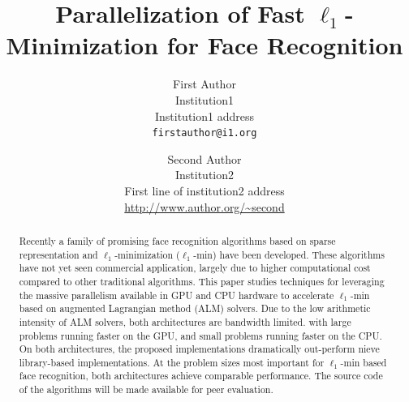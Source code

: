 \documentclass[10pt,twocolumn,letterpaper]{article}
\begin{document}
\title{Parallelization of Fast $\ell_1$-Minimization for Face Recognition}

\author{First Author\\
Institution1\\
Institution1 address\\
{\tt\small firstauthor@i1.org}
\and
Second Author\\
Institution2\\
First line of institution2 address\\
{\small\url{http://www.author.org/~second}}
}

\maketitle

\begin{abstract} Recently a family of promising face recognition algorithms
based on sparse representation and $\ell_1$-minimization ($\ell_1$-min) have been
developed.  These algorithms have not yet seen commercial application, 
largely due to higher computational cost compared to other traditional
algorithms. This paper studies techniques for leveraging the 
massive parallelism available in GPU and CPU hardware to accelerate
$\ell_1$-min based on augmented Lagrangian method (ALM) solvers. 
Due to the low arithmetic intensity of ALM solvers, both
architectures are bandwidth limited.  
with large problems running faster on the GPU, and small problems running faster
on the CPU.  
On both architectures, the proposed implementations dramatically out-perform
nieve library-based implementations. 
At the problem sizes most important for $\ell_1$-min based
face recognition, both architectures achieve comparable performance.
The source code of the
algorithms will be made available for peer evaluation.  \end{abstract}
\end{document}
